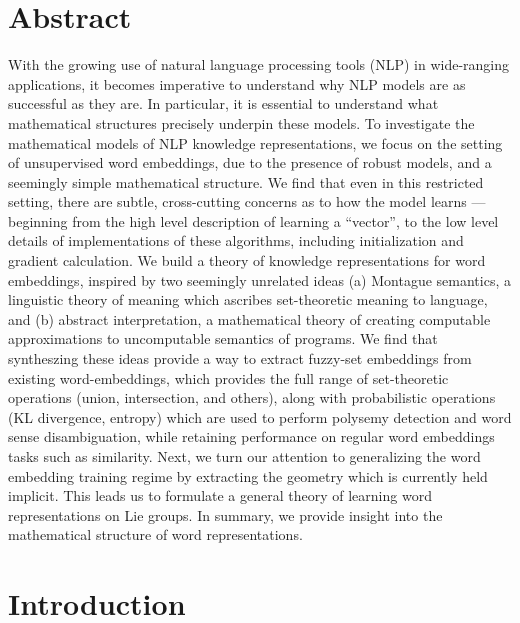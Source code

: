 \documentclass[11pt]{book}
\begin{document}
\chapter*{Abstract}
\label{ch:abstract}
With the growing use of natural language processing tools (NLP) in wide-ranging applications, it becomes imperative to understand why NLP models are as successful as they are. In particular, it is essential to understand what mathematical structures precisely underpin these models. To investigate the mathematical models of NLP knowledge representations, we focus on the setting of unsupervised word embeddings, due to the presence of robust models, and a seemingly simple mathematical structure. We find that even in this restricted setting, there are subtle, cross-cutting concerns as to how the model learns --- beginning from the high level description of learning a ``vector'', to the low level details of implementations of these algorithms, including initialization and gradient calculation. We build a theory of knowledge representations for word embeddings, inspired by two seemingly unrelated ideas (a) Montague semantics, a linguistic theory of meaning which ascribes set-theoretic meaning to language, and (b) abstract interpretation, a  mathematical theory of creating computable approximations to uncomputable semantics of programs. We find that syntheszing these ideas provide a way to extract fuzzy-set embeddings from existing word-embeddings, which provides the full range of set-theoretic operations (union, intersection, and others), along with probabilistic operations (KL divergence, entropy) which are used to perform polysemy detection and word sense disambiguation, while retaining performance on regular word embeddings tasks such as similarity. Next, we turn our attention to generalizing the word embedding training regime by extracting the geometry which is currently held implicit. This leads us to formulate a general theory of learning word representations on Lie groups. In summary, we provide insight into the mathematical structure of word representations. 



\tableofcontents
\listoffigures
\listoftables

\chapter{Introduction}
\end{document}
